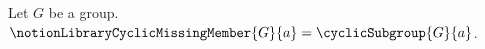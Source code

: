 

\begin{definition}\label{notion_library_cyclic_missing_member}
    Let $G$ be a group.
    $\notionLibraryCyclicMissingMember{G}{a}=\cyclicSubgroup{G}{a}$.
\end{definition}
